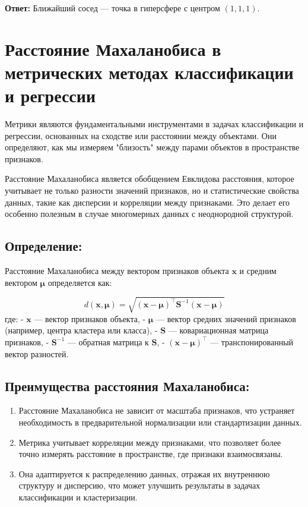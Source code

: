 \textbf{Ответ:} Ближайший сосед — точка в гиперсфере с центром \((1, 1, 1)\).

\section{Расстояние Махаланобиса в метрических методах классификации и регрессии}

Метрики являются фундаментальными инструментами в задачах классификации и регрессии, основанных на сходстве или расстоянии между объектами. Они определяют, как мы измеряем "близость" между парами объектов в пространстве признаков.

Расстояние Махаланобиса является обобщением Евклидова расстояния, которое учитывает не только разности значений признаков, но и статистические свойства данных, такие как дисперсии и корреляции между признаками. Это делает его особенно полезным в случае многомерных данных с неоднородной структурой.

\subsection{Определение:}

Расстояние Махаланобиса между вектором признаков объекта \( \mathbf{x} \) и средним вектором \( \mathbf{\mu} \) определяется как:

\[
d(\mathbf{x}, \mathbf{\mu}) = \sqrt{ (\mathbf{x} - \mathbf{\mu})^\top \mathbf{S}^{-1} (\mathbf{x} - \mathbf{\mu}) }
\]
\newline
где:
\newline
- \( \mathbf{x} \) — вектор признаков объекта, \newline
- \( \mathbf{\mu} \) — вектор средних значений признаков (например, центра кластера или класса), \newline
- \( \mathbf{S} \) — ковариационная матрица признаков, \newline
- \( \mathbf{S}^{-1} \) — обратная матрица к \( \mathbf{S} \), \newline
- \( (\mathbf{x} - \mathbf{\mu})^\top \) — транспонированный вектор разностей. \newline

\subsection{Преимущества расстояния Махаланобиса:}

\begin{enumerate}
    \item Расстояние Махаланобиса не зависит от масштаба признаков, что устраняет необходимость в предварительной нормализации или стандартизации данных.

    \item Метрика учитывает корреляции между признаками, что позволяет более точно измерять расстояние в пространстве, где признаки взаимосвязаны.

    \item Она адаптируется к распределению данных, отражая их внутреннюю структуру и дисперсию, что может улучшить результаты в задачах классификации и кластеризации.
\end{enumerate}

